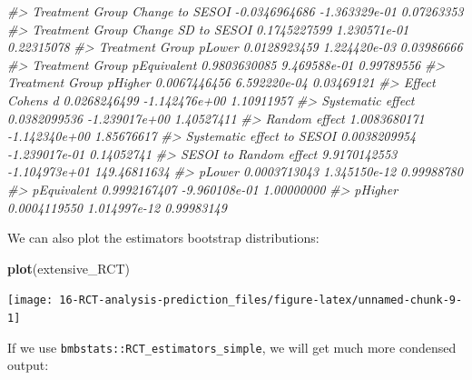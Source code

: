 \documentclass[
]{book}
\newenvironment{Shaded}{\begin{snugshade}}{\end{snugshade}}
\newcommand{\CommentTok}[1]{\textcolor[rgb]{0.56,0.35,0.01}{\textit{#1}}}
\newcommand{\KeywordTok}[1]{\textcolor[rgb]{0.13,0.29,0.53}{\textbf{#1}}}
\newcommand{\NormalTok}[1]{#1}
\begin{document}
\begin{Shaded}
\begin{Highlighting}[]
\CommentTok{\#>     Treatment Group Change to SESOI {-}0.0346964686 {-}1.363329e{-}01   0.07263353}
\CommentTok{\#>  Treatment Group Change SD to SESOI  0.1745227599  1.230571e{-}01   0.22315078}
\CommentTok{\#>              Treatment Group pLower  0.0128923459  1.224420e{-}03   0.03986666}
\CommentTok{\#>         Treatment Group pEquivalent  0.9803630085  9.469588e{-}01   0.99789556}
\CommentTok{\#>             Treatment Group pHigher  0.0067446456  6.592220e{-}04   0.03469121}
\CommentTok{\#>                    Effect Cohen\textquotesingle{}s d  0.0268246499 {-}1.142476e+00   1.10911957}
\CommentTok{\#>                   Systematic effect  0.0382099536 {-}1.239017e+00   1.40527411}
\CommentTok{\#>                       Random effect  1.0083680171 {-}1.142340e+00   1.85676617}
\CommentTok{\#>          Systematic effect to SESOI  0.0038209954 {-}1.239017e{-}01   0.14052741}
\CommentTok{\#>              SESOI to Random effect  9.9170142553 {-}1.104973e+01 149.46811634}
\CommentTok{\#>                              pLower  0.0003713043  1.345150e{-}12   0.99988780}
\CommentTok{\#>                         pEquivalent  0.9992167407 {-}9.960108e{-}01   1.00000000}
\CommentTok{\#>                             pHigher  0.0004119550  1.014997e{-}12   0.99983149}
\end{Highlighting}
\end{Shaded}

We can also plot the estimators bootstrap distributions:

\begin{Shaded}
\begin{Highlighting}[]
\KeywordTok{plot}\NormalTok{(extensive\_RCT)}
\end{Highlighting}
\end{Shaded}

\begin{center}\texttt{[image: 16-RCT-analysis-prediction\_files/figure-latex/unnamed-chunk-9-1]} \end{center}

If we use \texttt{bmbstats::RCT\_estimators\_simple}, we will get much more condensed output:
\end{document}
